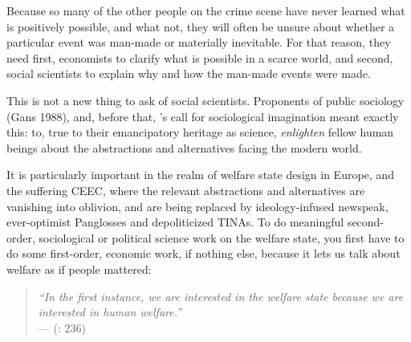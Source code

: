 Because so many of the other people on the crime scene have never learned what is positively possible, and what not, they will often be unsure about whether a particular event was man-made or materially inevitable. For that reason, they need first, economists to clarify what is possible in a scarce world, and second, social scientists to explain why and how the man-made events were made.

This is not a new thing to ask of social scientists. Proponents of public sociology (Gans 1988), and, before that, \citeauthor{Mills-1959-aa}'s call for sociological imagination meant exactly this: to, true to their emancipatory heritage as science, \emph{enlighten} fellow human beings about the abstractions and alternatives facing the modern world.

It is particularly important in the realm of welfare state design in Europe, and the suffering \gls{CEEC}, where the relevant abstractions and alternatives are vanishing into oblivion, and are being replaced by ideology-infused newspeak, ever-optimist Panglosses and depoliticized TINAs. To do meaningful second-order, sociological or political science work on the welfare state, you first have to do some first-order, economic work, if nothing else, because it lets us talk about welfare as if people mattered:
\begin{quote}
	\emph{``In the first instance, we are interested in the welfare state because we are interested in human welfare.''}\\
	--- \citeauthor{Haggard2009} (\citeyear{Haggard2009}: 236) 
\end{quote}


